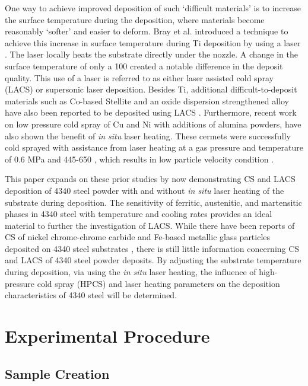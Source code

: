 One way to achieve improved deposition of such ‘difficult materials’ is to increase the surface temperature during the deposition, where materials become reasonably ‘softer’ and easier to deform. Bray et al. introduced a technique to achieve this increase in surface temperature during Ti deposition by using a laser \cite{RN173}. The laser locally heats the substrate directly under the nozzle. A change in the surface temperature of only a 100 \celsius{} created a notable difference in the deposit quality. This use of a laser is referred to as either laser assisted cold spray (LACS) or supersonic laser deposition. Besides Ti, additional difficult-to-deposit materials such as Co-based Stellite and an oxide dispersion strengthened alloy have also been reported to be deposited using LACS \cite{RN135,RN1390,RN383}. Furthermore, recent work on low pressure cold spray of Cu and Ni with additions of alumina powders, have also shown the benefit of \textit{in situ} laser heating.  These cermets were successfully cold sprayed with assistance from laser heating at a gas pressure and temperature of 0.6 MPa and 445-650 \celsius{}, which results in low particle velocity condition \cite{RN3366}.


This paper expands on these prior studies by now demonstrating CS and LACS deposition of 4340 steel powder with and without \textit{in situ} laser heating of the substrate during deposition. The sensitivity of ferritic, austenitic, and martensitic phases in 4340 steel with temperature and cooling rates provides an ideal material to further the investigation of LACS. While there have been reports of CS of nickel chrome-chrome carbide and Fe-based metallic glass particles deposited on 4340 steel substrates \cite{RN511,RN345}, there is still little information concerning CS and LACS of 4340 steel powder deposits. By adjusting the substrate temperature during deposition, via using the \textit{in situ} laser heating, the influence of high-pressure cold spray (HPCS) and laser heating parameters on the deposition characteristics of 4340 steel will be determined.



\section*{Experimental Procedure}

\subsection*{Sample Creation}
\label{Sample Creation}


